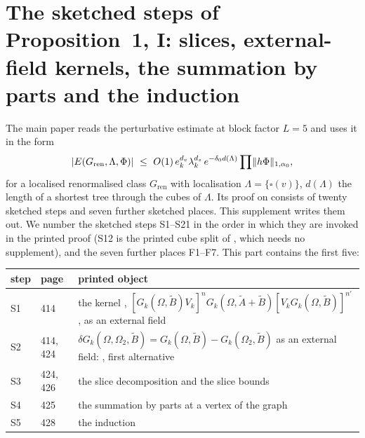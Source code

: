 
\section{The sketched steps of Proposition~1, I: slices, external-field kernels, the summation by parts and the induction}\label{sup1:sec}

The main paper reads the perturbative estimate \cite[Prop.~1, (1.33)]{Ba3} at block factor $L=5$ and uses it in the form
\[
|E(G_{\mathrm{ren}},\Lambda,\Phi)|\ \le\ O(1)\,e_k^{d_v}\lambda_k^{d_s}\,e^{-\delta_0d(\Lambda)}\prod\norm{h\Phi}_{1,\alpha_0},
\]
for a localised renormalised class $G_{\mathrm{ren}}$ with localisation $\Lambda=\{\square(v)\}$, $d(\Lambda)$ the length of a shortest tree through the cubes of $\Lambda$. Its proof on \cite[pp.~420--445]{Ba3} consists of twenty sketched steps and seven further sketched places. This supplement writes them out. We number the sketched steps S1--S21 in the order in which they are invoked in the printed proof (S12 is the printed cube split of \cite[p.~433]{Ba3}, which needs no supplement), and the seven further places F1--F7. This part contains the first five:

\begin{center}
\begin{tabular}{lll}
step & \cite{Ba3} page & printed object\\\hline
S1 & 414 & the kernel \cite[(1.16)]{Ba3}, $[G_k(\Omega,\tilde B)V_k]^nG_k(\Omega,\tilde A+\tilde B)[V_kG_k(\Omega,\tilde B)]^{n'}$, as an external field\\
S2 & 414, 424 & $\delta G_k(\Omega,\Omega_2,\tilde B)=G_k(\Omega,\tilde B)-G_k(\Omega_2,\tilde B)$ as an external field: \cite[(2.5)]{Ba3}, first alternative\\
S3 & 424, 426 & the slice decomposition \cite[(2.6)]{Ba3} and the slice bounds \cite[(2.10)--(2.12)]{Ba3}\\
S4 & 425 & the summation by parts \cite[(2.8)--(2.9)]{Ba3} at a vertex of the graph \cite[(2.4)]{Ba3}\\
S5 & 428 & the induction \cite[(2.16)]{Ba3}
\end{tabular}
\end{center}

